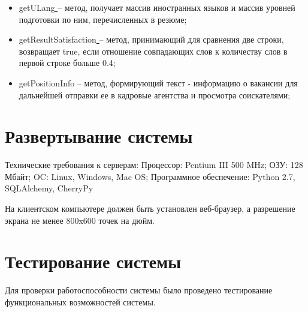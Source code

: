 \begin{itemize}
\item \underline{ }\underline{ }getULang\underline{ }\underline{ } – метод, получает массив иностранных языков и массив уровней подготовки по ним, перечисленных в резюме;
\item \underline{ }\underline{ }getResultSatisfaction\underline{ }\underline{ } – метод, принимающий для сравнения две строки, возвращает true, если отношение совпадающих слов к количеству слов в первой строке больше 0.4;
\item \underline{ }\underline{ }getPositionInfo – метод, формирующий текст - информацию о вакансии для дальнейшей отправки ее в кадровые агентства и просмотра соискателями;

\end{itemize}

\section{Развертывание системы} 
Технические требования к серверам:
Процессор: Pentium III 500 MHz;
ОЗУ: 128 Мбайт;
OC: Linux, Windows, Mac OS;
Программное обеспечение: Python 2.7, SQLAlchemy, CherryPy

На клиентском компьютере должен быть установлен веб-браузер, а разрешение экрана не менее 800x600 точек на дюйм.

\section{Тестирование системы} 
Для проверки работоспособности системы было проведено тестирование функциональных возможностей системы.

